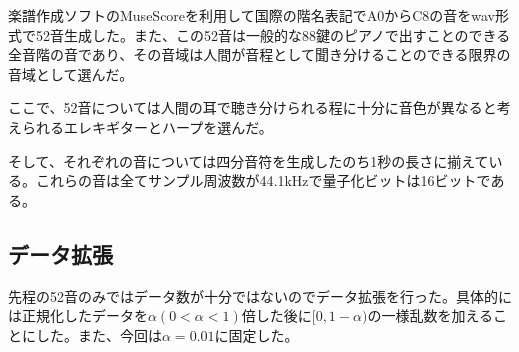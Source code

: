 楽譜作成ソフトのMuseScoreを利用して国際の階名表記でA0からC8の音をwav形式で52音生成した。また、この52音は一般的な88鍵のピアノで出すことのできる全音階の音であり、その音域は人間が音程として聞き分けることのできる限界の音域として選んだ。\par
ここで、52音については人間の耳で聴き分けられる程に十分に音色が異なると考えられるエレキギターとハープを選んだ。\par
そして、それぞれの音については四分音符を生成したのち1秒の長さに揃えている。これらの音は全てサンプル周波数が44.1kHzで量子化ビットは16ビットである。

\subsection{データ拡張}
先程の52音のみではデータ数が十分ではないのでデータ拡張を行った。具体的には正規化したデータを$\alpha(0 < \alpha <1)$倍した後に$[0,1-\alpha)$の一様乱数を加えることにした。また、今回は$\alpha=0.01$に固定した。


